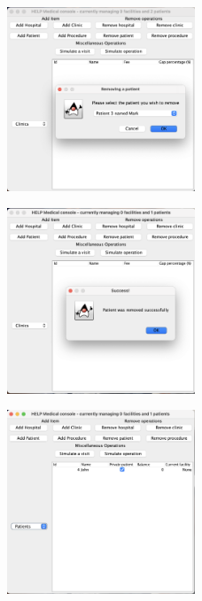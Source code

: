 \documentclass{article}
\begin{document}
\begin{figure}
  \begin{center}
  \includegraphics[width=0.5\textwidth]{./figures/Remove/Patient_1.png}
  \end{center}
\end{figure}

\begin{figure}
  \begin{center}
  \includegraphics[width=0.5\textwidth]{./figures/Remove/Patient_2.png}
  \end{center}
\end{figure}

\begin{figure}
  \begin{center}
  \includegraphics[width=0.5\textwidth]{./figures/Remove/Patient_3.png}
  \end{center}
\end{figure}
\end{document}
